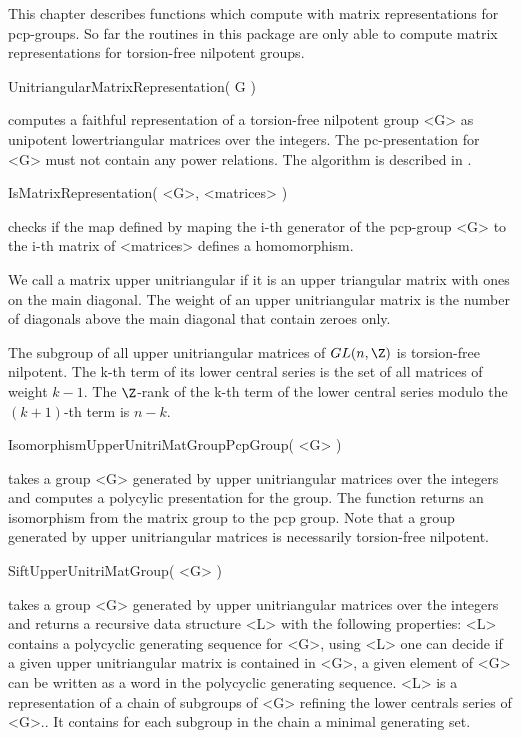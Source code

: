 

This chapter describes functions which compute with matrix
representations for pcp-groups.  So far the routines in this package
are only able to compute matrix representations for torsion-free
nilpotent groups.

\>UnitriangularMatrixRepresentation( G )

computes a faithful representation of a torsion-free nilpotent group
<G> as unipotent lowertriangular matrices over the integers.  The
pc-presentation for <G> must not contain any power relations.  The
algorithm is described in \cite{dGN02}.

\>IsMatrixRepresentation( <G>, <matrices> )

checks if the map defined by maping the i-th generator of the
pcp-group <G> to the i-th matrix of <matrices> defines a homomorphism.


We call a matrix upper unitriangular if it is an upper triangular
matrix with ones on the main diagonal.  The weight of an upper
unitriangular matrix is the number of diagonals above the main
diagonal that contain zeroes only.  

The subgroup of all upper unitriangular matrices of $GL(n,\Z)$ is
torsion-free nilpotent.  The k-th term of its lower central series is
the set of all matrices of weight $k-1$.  The $\Z$-rank of the k-th
term of the lower central series modulo the $(k+1)$-th term is $n-k$.

\>IsomorphismUpperUnitriMatGroupPcpGroup( <G> )

takes a group <G> generated by upper unitriangular matrices over the
integers and computes a polycylic presentation for the group.  The
function returns an isomorphism from the matrix group to the pcp
group.  Note that a group generated by upper unitriangular matrices is
necessarily torsion-free nilpotent.

\>SiftUpperUnitriMatGroup( <G> )
 
takes a group <G> generated by upper unitriangular matrices over the
integers and returns a recursive data structure <L> with the following
properties: <L> contains a polycyclic generating sequence for <G>,
using <L> one can decide if a given upper unitriangular matrix is
contained in <G>, a given element of <G> can be written as a word in
the polycyclic generating sequence.  <L> is a representation of a
chain of subgroups of <G> refining the lower centrals series of <G>..
It contains for each subgroup in the chain a minimal generating set.

